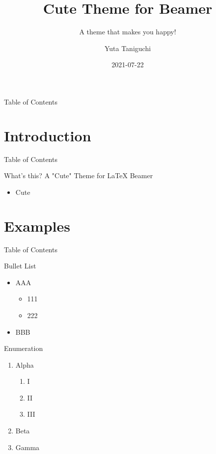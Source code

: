 \documentclass[12pt,t]{beamer}
\title[Cute Theme]{Cute Theme for Beamer}
\subtitle{A theme that makes you happy!}
\author[Y.~Taniguchi]{Yuta Taniguchi}
\institute{@yuttieyuttie}
\date{2021-07-22}
\begin{document}
{
  \frame{\titlepage}
}
\setcounter{framenumber}{0}


\begin{frame}{Table of Contents}
  \toc
\end{frame}


\section{Introduction}
\begin{frame}{Table of Contents}
  \toc[currentsection]
\end{frame}


\begin{frame}{What's this?}
  \alert{A "Cute" Theme for LaTeX Beamer}
  \begin{itemize}
    \item Cute
  \end{itemize}
\end{frame}


\section{Examples}
\begin{frame}{Table of Contents}
  \toc[currentsection]
\end{frame}


\begin{frame}{Bullet List}
  \begin{itemize}
  \item AAA
    \begin{itemize}
    \item 111
    \item 222
    \end{itemize}
  \item BBB
  \end{itemize}
\end{frame}


\begin{frame}{Enumeration}
  \begin{enumerate}
  \item Alpha
    \begin{enumerate}
    \item I
    \item II
    \item III
    \end{enumerate}
  \item Beta
  \item Gamma
  \end{enumerate}
\end{frame}
\end{document}
